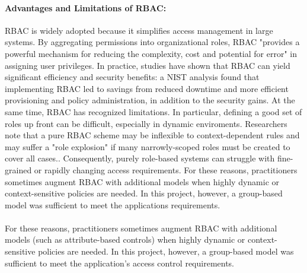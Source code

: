 \documentclass[a4paper,12pt]{report}
\begin{document}
\paragraph{Advantages and Limitations of RBAC:} RBAC is widely adopted because it simplifies access management in large systems. By aggregating permissions into organizational roles, RBAC "provides a powerful mechanism for reducing the complexity, cost and potential for error" in assigning user privileges. In practice, studies have shown that RBAC can yield significant efficiency and security benefits: a NIST analysis found that implementing RBAC led to savings from reduced downtime and more efficient provisioning and policy administration, in addition to the security gains. At the same time, RBAC has recognized limitations. In particular, defining a good set of roles up front can be difficult, especially in dynamic enviroments. Researchers note that a pure RBAC scheme may be inflexible to context-dependent rules and may suffer a "role explosion" if many narrowly-scoped roles must be created to cover all cases.. Consequently, purely role-based systems can struggle with fine-grained or rapidly changing access requirements. For these reasons, practitioners sometimes augment RBAC with additional models when highly dynamic or context-sensitive policies are needed. In this project, however, a group-based model was sufficient to meet the applications requirements.\\\\For these reasons, practitioners sometimes augment RBAC with additional models (such as attribute-based controls) when highly dynamic or context-sensitive policies are needed. In this project, however, a group-based model was sufficient to meet the application's access control requirements.\parencite{rbac}
\end{document}
